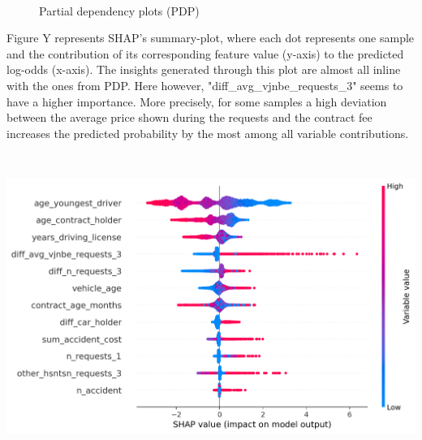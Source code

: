 \documentclass[12pt,titlepage]{article}
\begin{document}
\begin{figure}
\begin{subfigure}{.55\textwidth}
    \end{subfigure} \\
\caption{Partial dependency plots (PDP)}
\label{fig:pdp}
\end{figure}

Figure Y represents SHAP's summary-plot, where each dot represents one sample and the contribution of its corresponding feature value (y-axis) to the predicted log-odds (x-axis). The insights generated through this plot are almost all inline with the ones from PDP. Here however, "diff\_avg\_vjnbe\_requests\_3" seems to have a higher importance. More precisely, for some samples a high deviation between the average price shown during the requests and the contract fee increases the predicted probability by the most among all variable contributions. \\
\centerline{\includegraphics[height=10cm]{shap_summary.png}}
\end{document}
